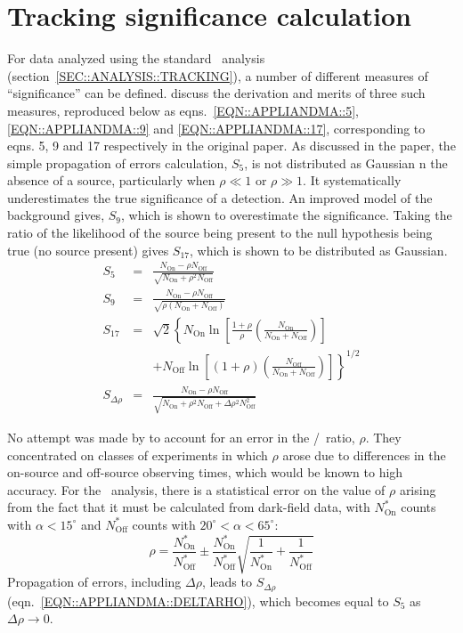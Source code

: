 \chapter{Tracking significance calculation}
\label{APP::LIANDMA}

For data analyzed using the standard \Trk\ analysis
(section~\ref{SEC::ANALYSIS::TRACKING}), a number of different
measures of ``significance'' can be
defined. \citet{REF::LIANDMA::1983APJ} discuss the derivation and
merits of three such measures, reproduced below as
eqns.~\ref{EQN::APPLIANDMA::5}, \ref{EQN::APPLIANDMA::9} and
\ref{EQN::APPLIANDMA::17}, corresponding to eqns. 5, 9 and 17
respectively in the original paper. As discussed in the paper, the
simple propagation of errors calculation, $S_5$, is not distributed as
Gaussian n the absence of a source, particularly when $\rho\ll1$ or
$\rho\gg1$.  It systematically underestimates the true significance of
a detection. An improved model of the background gives, $S_9$, which
is shown to overestimate the significance. Taking the ratio of the
likelihood of the source being present to the null hypothesis being
true (no source present) gives $S_{17}$, which is shown to be
distributed as Gaussian.
\begin{eqnarray}
S_5 & = & \frac{N_\mathrm{On}-\rho N_\mathrm{Off}}{\sqrt{N_\mathrm{On}+\rho^2N_\mathrm{Off}}}\label{EQN::APPLIANDMA::5}\\
S_9 & = & \frac{N_\mathrm{On}-\rho N_\mathrm{Off}}{\sqrt{\rho(N_\mathrm{On}+N_\mathrm{Off})}}\label{EQN::APPLIANDMA::9}\\
S_{17} & = & \sqrt{2}\left\{N_\mathrm{On}\ln\left[\frac{1+\rho}{\rho}\left(\frac{N_\mathrm{On}}{N_\mathrm{On}+N_\mathrm{Off}}\right)\right]\nonumber\right.\\
&  & + \left.N_\mathrm{Off}\ln\left[(1+\rho)\left(\frac{N_\mathrm{Off}}{N_\mathrm{On}+N_\mathrm{Off}}\right)\right]\right\}^{1/2}\label{EQN::APPLIANDMA::17}\\
S_{\Delta\rho} & = & \frac{N_\mathrm{On}-\rho N_\mathrm{Off}}{\sqrt{N_\mathrm{On}+\rho^2N_\mathrm{Off}+\Delta\rho^2N_\mathrm{Off}^2}}\label{EQN::APPLIANDMA::DELTARHO}
\end{eqnarray}

No attempt was made by \citet{REF::LIANDMA::1983APJ} to account for an
error in the \On/\Off\ ratio, $\rho$. They concentrated on classes of
experiments in which $\rho$ arose due to differences in the on-source
and off-source observing times, which would be known to high
accuracy. For the \Trk\ analysis, there is a statistical error on the
value of $\rho$ arising from the fact that it must be calculated from
dark-field data, with $N^*_\mathrm{On}$ counts with $\alpha<15^\circ$
and $N^*_\mathrm{Off}$ counts with $20^\circ<\alpha<65^\circ$:
\[\rho = \frac{N^*_\mathrm{On}}{N^*_\mathrm{Off}}\pm
\frac{N^*_\mathrm{On}}{N^*_\mathrm{Off}}\sqrt{\frac{1}{N^*_\mathrm{On}}+\frac{1}{N^*_\mathrm{Off}}}\]
Propagation of errors, including $\Delta\rho$, leads to
$S_{\Delta\rho}$ (eqn.~\ref{EQN::APPLIANDMA::DELTARHO}), which becomes
equal to $S_5$ as $\Delta\rho\rightarrow0$.

